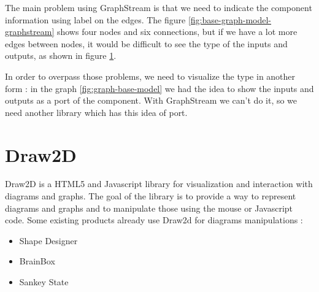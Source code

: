 The main problem using GraphStream is that we need to indicate the component
information using label on the edges. The figure
\ref{fig:base-graph-model-graphstream} shows four nodes and six connections, but
if we have a lot more edges between nodes, it would be difficult to see the
type of the inputs and outputs, as shown in figure
\ref{fig:graphstream-lot-of-edges}.

\begin{figure}[H]
  \centering
  \caption[Label on multiple edges using GraphStream]{}
  \label{fig:graphstream-lot-of-edges}
\end{figure}

In order to overpass those problems, we need to visualize the type in another
form : in the graph \ref{fig:graph-base-model} we had the idea to show the
inputs and outputs as a port of the component. With GraphStream we can't do
it, so we need another library which has this idea of port.

\section{Draw2D}
\label{sec:Draw2D}

Draw2D is a HTML5 and Javascript library for visualization and interaction with
diagrams and graphs\cite{draw2d}. The goal of the library is to provide a way to
represent diagrams and graphs and to manipulate those using the mouse or Javascript
code. Some existing products already use Draw2d for diagrams manipulations :

\begin{itemize}
\item Shape Designer\cite{draw2d}
\item BrainBox\cite{draw2d}
\item Sankey State\cite{draw2d}
\end{itemize}

